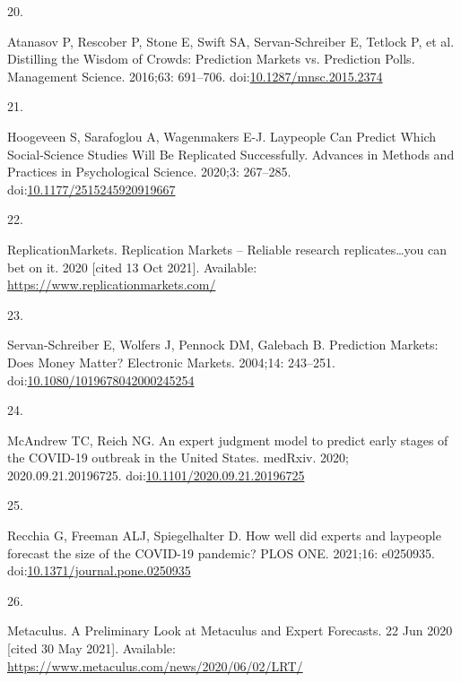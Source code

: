 \documentclass[10pt,letterpaper]{article}
\newlength{\cslhangindent}
\newlength{\csllabelwidth}
\newlength{\cslentryspacingunit} %
\newenvironment{CSLReferences}[2] %
 {%
  \setlength{\parindent}{0pt}
  \ifodd #1
  \let\oldpar\par
  \def\par{\hangindent=\cslhangindent\oldpar}
  \fi
  \setlength{\parskip}{#2\cslentryspacingunit}
 }%
 {}
\newcommand{\CSLLeftMargin}[1]{\parbox[t]{\csllabelwidth}{#1}}
\newcommand{\CSLRightInline}[1]{\parbox[t]{\linewidth - \csllabelwidth}{#1}\break}
\begin{document}
\begin{CSLReferences}{0}{0}
\leavevmode{}%
\CSLLeftMargin{20. }%
\CSLRightInline{Atanasov P, Rescober P, Stone E, Swift SA,
Servan-Schreiber E, Tetlock P, et al. Distilling the {Wisdom} of
{Crowds}: {Prediction Markets} vs. {Prediction Polls}. Management
Science. 2016;63: 691--706.
doi:\href{https://doi.org/10.1287/mnsc.2015.2374}{10.1287/mnsc.2015.2374}}

\leavevmode{}%
\CSLLeftMargin{21. }%
\CSLRightInline{Hoogeveen S, Sarafoglou A, Wagenmakers E-J. Laypeople
{Can Predict Which Social-Science Studies Will Be Replicated
Successfully}. Advances in Methods and Practices in Psychological
Science. 2020;3: 267--285.
doi:\href{https://doi.org/10.1177/2515245920919667}{10.1177/2515245920919667}}

\leavevmode{}%
\CSLLeftMargin{22. }%
\CSLRightInline{ReplicationMarkets. Replication {Markets} -- {Reliable}
research replicates\ldots you can bet on it. 2020 {[}cited 13 Oct
2021{]}. Available: \url{https://www.replicationmarkets.com/}}

\leavevmode{}%
\CSLLeftMargin{23. }%
\CSLRightInline{Servan-Schreiber E, Wolfers J, Pennock DM, Galebach B.
Prediction {Markets}: {Does Money Matter}? Electronic Markets. 2004;14:
243--251.
doi:\href{https://doi.org/10.1080/1019678042000245254}{10.1080/1019678042000245254}}

\leavevmode{}%
\CSLLeftMargin{24. }%
\CSLRightInline{McAndrew TC, Reich NG. An expert judgment model to
predict early stages of the {COVID-19} outbreak in the {United States}.
medRxiv. 2020; 2020.09.21.20196725.
doi:\href{https://doi.org/10.1101/2020.09.21.20196725}{10.1101/2020.09.21.20196725}}

\leavevmode{}%
\CSLLeftMargin{25. }%
\CSLRightInline{Recchia G, Freeman ALJ, Spiegelhalter D. How well did
experts and laypeople forecast the size of the {COVID-19} pandemic? PLOS
ONE. 2021;16: e0250935.
doi:\href{https://doi.org/10.1371/journal.pone.0250935}{10.1371/journal.pone.0250935}}

\leavevmode{}%
\CSLLeftMargin{26. }%
\CSLRightInline{Metaculus. A {Preliminary Look} at {Metaculus} and
{Expert Forecasts}. 22 Jun 2020 {[}cited 30 May 2021{]}. Available:
\url{https://www.metaculus.com/news/2020/06/02/LRT/}}


\end{CSLReferences}
\end{document}
